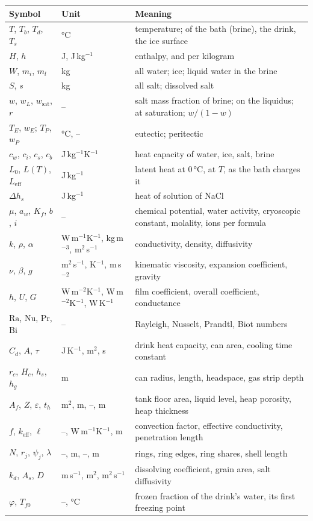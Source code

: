 \documentclass[11pt,a4paper]{article}
\begin{document}
\begin{center}\small
\begin{tabularx}{\linewidth}{@{}l l X@{}}
\toprule
Symbol & Unit & Meaning \\ \midrule
$T$, $T_b$, $T_d$, $T_s$ & °C & temperature; of the bath (brine), the drink, the ice surface \\
$H$, $h$ & J, J\,kg$^{-1}$ & enthalpy, and per kilogram \\
$W$, $m_i$, $m_l$ & kg & all water; ice; liquid water in the brine \\
$S$, $s$ & kg & all salt; dissolved salt \\
$w$, $w_L$, $w_{\text{sat}}$, $r$ & – & salt mass fraction of brine; on the liquidus; at saturation; $w/(1-w)$ \\
$T_E$, $w_E$; $T_P$, $w_P$ & °C, – & eutectic; peritectic \\
$c_w$, $c_i$, $c_s$, $c_b$ & J\,kg$^{-1}$K$^{-1}$ & heat capacity of water, ice, salt, brine \\
$L_0$, $L(T)$, $L_{\text{eff}}$ & J\,kg$^{-1}$ & latent heat at 0\,°C, at $T$, as the bath charges it \\
$\Delta h_s$ & J\,kg$^{-1}$ & heat of solution of NaCl \\
$\mu$, $a_w$, $K_f$, $b$, $i$ & – & chemical potential, water activity, cryoscopic constant, molality, ions per formula \\
$k$, $\rho$, $\alpha$ & W\,m$^{-1}$K$^{-1}$, kg\,m$^{-3}$, m$^2$\,s$^{-1}$ & conductivity, density, diffusivity \\
$\nu$, $\beta$, $g$ & m$^2$\,s$^{-1}$, K$^{-1}$, m\,s$^{-2}$ & kinematic viscosity, expansion coefficient, gravity \\
$h$, $U$, $G$ & W\,m$^{-2}$K$^{-1}$, W\,m$^{-2}$K$^{-1}$, W\,K$^{-1}$ & film coefficient, overall coefficient, conductance \\
$\mathrm{Ra}$, $\mathrm{Nu}$, $\mathrm{Pr}$, $\mathrm{Bi}$ & – & Rayleigh, Nusselt, Prandtl, Biot numbers \\
$C_d$, $A$, $\tau$ & J\,K$^{-1}$, m$^2$, s & drink heat capacity, can area, cooling time constant \\
$r_c$, $H_c$, $h_s$, $h_g$ & m & can radius, length, headspace, gas strip depth \\
$A_f$, $Z$, $\varepsilon$, $t_h$ & m$^2$, m, –, m & tank floor area, liquid level, heap porosity, heap thickness \\
$f$, $k_{\text{eff}}$, $\ell$ & –, W\,m$^{-1}$K$^{-1}$, m & convection factor, effective conductivity, penetration length \\
$N$, $r_j$, $\psi_j$, $\lambda$ & –, m, –, m & rings, ring edges, ring shares, shell length \\
$k_d$, $A_s$, $D$ & m\,s$^{-1}$, m$^2$, m$^2$\,s$^{-1}$ & dissolving coefficient, grain area, salt diffusivity \\
$\varphi$, $T_{f0}$ & –, °C & frozen fraction of the drink's water, its first freezing point \\
\bottomrule
\end{tabularx}
\end{center}
\end{document}
